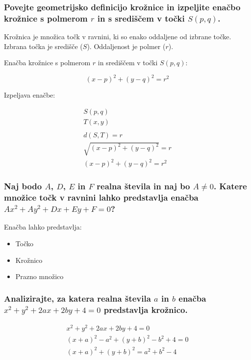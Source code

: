 \documentclass{article}
\begin{document}
\subsubsection*{Povejte geometrijsko definicijo krožnice in izpeljite enačbo krožnice s polmerom $r$ in s središčem v točki $S(p, q)$.}

Krožnica je množica točk v ravnini, ki so enako oddaljene od izbrane točke. Izbrana točka je središče ($S$). Oddaljenost je polmer ($r$).

\vspace{5mm}

Enačba krožnice s polmerom $r$ in središčem v točki $S(p, q)$:

$$
(x-p)^2 + (y-q)^2 = r^2
$$

\vspace{5mm}

Izpeljava enačbe:

\begin{equation*}
\begin{gathered}
S(p, q) \\
T(x, y) \\
\\
d(S, T) = r \\
\sqrt{(x-p)^2 + (y-q)^2} = r \\
(x-p)^2 + (y-q)^2 = r^2
\end{gathered}
\end{equation*}

\subsubsection*{Naj bodo $A$, $D$, $E$ in $F$ realna števila in naj bo $A \neq 0$. Katere množice točk v ravnini lahko predstavlja enačba $A x^{2}+A y^{2}+D x+E y+F=0$?}

Enačba lahko predstavlja:

\begin{itemize}
  \item Točko
  \item Krožnico
  \item Prazno množico
\end{itemize}

\subsubsection*{Analizirajte, za katera realna števila $a$ in $b$ enačba $x^{2}+y^{2}+2 a x+2 b y+4=0$ predstavlja krožnico.}

\begin{equation*}
\begin{gathered}
x^2 + y^2 + 2ax + 2by + 4 = 0 \\
(x+a)^2 - a^2 + (y+b)^2 - b^2 + 4 = 0 \\
(x+a)^2 + (y+b)^2 = a^2 + b^2 - 4
\end{gathered}
\end{equation*}
\end{document}
